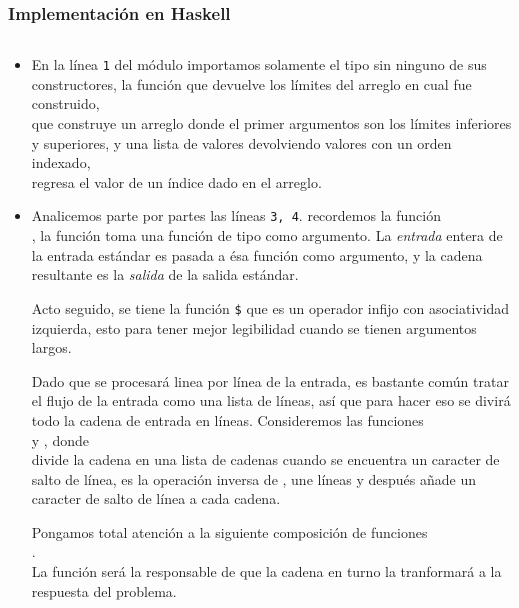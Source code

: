 \subsubsection{Implementación en Haskell}
\inputminted[linenos, frame=lines]{haskell}{problemas/haskell/FINDSR.hs}

\begin{itemize}
\item En la línea \texttt{1} del módulo  importamos solamente el tipo
 sin ninguno de sus constructores, la función 
que devuelve los límites del arreglo en cual fue construido,\\
 que construye un arreglo donde el primer
argumentos son los límites inferiores y superiores, y una lista de valores devolviendo valores
con un orden indexado,\\
  regresa el valor de un índice dado en el arreglo.

\item Analicemos parte por partes las líneas \texttt{3, 4}. recordemos la función \\
, la función  toma una función de
tipo  como argumento. La \textit{entrada} entera de la entrada estándar
es pasada a ésa función como argumento, y la cadena resultante es la \textit{salida} de la
salida estándar.

Acto seguido, se tiene la función \texttt{\$} que es un operador infijo con asociatividad izquierda,
esto para tener mejor legibilidad cuando se tienen argumentos largos.

Dado que se procesará linea por línea de la entrada, es bastante común tratar el flujo de la
entrada como una lista de líneas, así que para hacer eso se divirá todo la cadena de entrada en
líneas. Consideremos las funciones\\  y
, donde\\  divide la cadena en una lista de
cadenas cuando se encuentra un caracter de salto de línea,  es la operación inversa
de , une líneas y después añade un caracter de salto de línea a cada cadena.

Pongamos total atención a la siguiente composición de funciones\\
.\\
La función  será la responsable de que la cadena en turno la tranformará a la
respuesta del problema.


\end{itemize}

